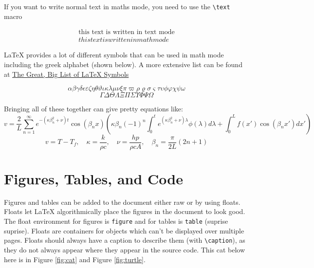 \documentclass[11pt, twoside]{article}
\begin{document}
If you want to write normal text in maths mode, you need to use the \lstinline{\text} macro

\begin{align}
    \text{this text is written in text mode} \\
    this text is written in math mode
\end{align}

\LaTeX{} provides a lot of different  symbols that can be  used in math mode including the greek alphabet (shown below). A more extensive list can be found at \href{https://www.rpi.edu/dept/arc/training/latex/LaTeX_symbols.pdf}{The Great, Big List of \LaTeX{} Symbols} \parencite{carlisle_great_2001}

\begin{equation}
    \alpha \beta \gamma \delta \epsilon \varepsilon \zeta \eta \theta \vartheta \iota \kappa \lambda \mu \nu \xi \pi \varpi \rho \varrho \sigma \varsigma \tau \upsilon \phi \varphi \chi \psi \omega
\end{equation}
\begin{equation}
    \Gamma \Delta \Theta \Lambda \Xi \Pi \Sigma \Upsilon \Phi \Psi \Omega
\end{equation}

Bringing all of these together can give pretty equations like:
\begin{equation*}
    v = \frac{2}{L} \sum_{n=1}^\infty e^{-(\kappa \beta_n^2 + \nu) t} \cos{(\beta_nx)}
    \left(
    \kappa \beta_n(-1)^n
    \int_0^t e^{(\kappa \beta_n^2 + \nu)\lambda}\phi(\lambda) d\lambda +
    \int_0^L f(x') \cos{(\beta_nx')} dx'
    \right)
\end{equation*}
\begin{equation*}
    v = T - T_f, \quad \kappa = \frac{k}{\rho c}, \quad \nu = \frac{h p}{\rho c A}, \quad \beta_n = \frac{\pi}{2L}(2n + 1)
\end{equation*}

\newpage
\section{Figures, Tables, and Code}

Figures and tables can be added to the document either raw or by using floats. Floats let \LaTeX{} algorithmically place the figures in the document to look good. The float environment for figures is \lstinline{figure} and for tables is \lstinline{table} (suprise suprise). Floats are containers for objects which can't be displayed over multiple pages. Floats should always have a caption to describe them (with \lstinline{\caption}), as they do not always appear where they appear in the source code. This cat below here is in Figure \ref{fig:cat} and Figure \ref{fig:turtle}.
\end{document}
